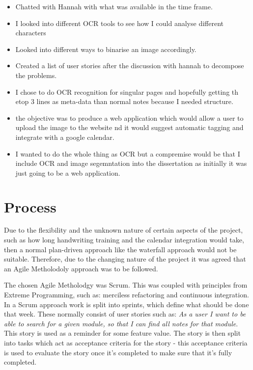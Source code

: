 \begin{itemize}
  \item Chatted with Hannah with what was available in the time frame.
  \item I looked into different OCR tools to see how I could analyse different characters
  \item Looked into different ways to binarise an image accordingly.
  \item Created a list of user stories after the discussion with hannah to decompose the problems.
  \item I chose to do OCR recognition for singular pages and hopefully getting th etop 3 lines as meta-data than normal notes because I needed structure.
  \item the objective was to produce a web application which would allow a user to upload the image to the website nd it would suggest automatic tagging and integrate with a google calendar.
  \item I wanted to do the whole thing as OCR but a compremise would be that I include OCR and image segemntation into the dissertation as initially it was just going to be a web application.
\end{itemize}

\section{Process}
Due to the flexibility and the unknown nature of certain aspects of the project, such as how long handwriting training and the calendar integration would take, then a normal plan-driven approach like the waterfall approach would not be suitable. Therefore, due to the changing nature of the project it was agreed that an Agile Metholodoly approach was to be followed.

The chosen Agile Metholodgy was Scrum. This was coupled with principles from Extreme Programming, such as: merciless refactoring and continuous integration. In a Scrum approach work is split into sprints, which define what should be done that week. These normally consist of user stories such as: \textit{As a user I want to be able to search for a given module, so that I can find all notes for that module}. This story is used as a reminder for some feature value. The story is then split into tasks which act as acceptance criteria for the story - this acceptance criteria is used to evaluate the story once it's completed to make sure that it's fully completed.

